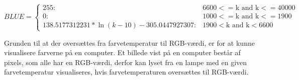 \begin{displaymath}
   BLUE = \left\{
     \begin{array}{lr}
       255: & 6600 <= \text{k and k} <= 40000\\
       0: & 1000 <= \text{k and k} <= 1900\\
       138.5177312231 * \ln(k-10) - 305.0447927307: & 1900 < \text{k and k} < 6600
     \end{array}
   \right.
\end{displaymath} 

Grunden til at der oversættes fra farvetemperatur til RGB-værdi, er for at kunne visualisere farverne på en computer. Et billede vist på en computer består af pixels, som alle har en RGB-værdi, derfor kan lyset fra en lampe med en given farvetemperatur visualiseres, hvis farvetemperaturen oversættes til RGB-værdi.











